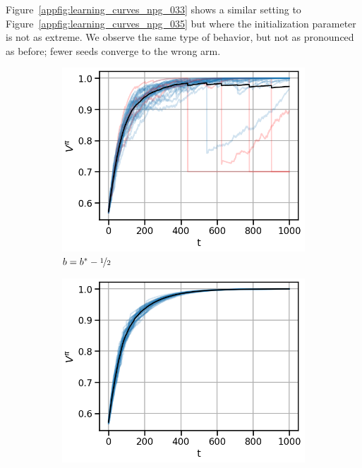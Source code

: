 Figure~\ref{appfig:learning_curves_npg_033} shows a similar setting to Figure~\ref{appfig:learning_curves_npg_035} but where the initialization parameter is not as extreme. We observe the same type of behavior, but not as pronounced as before; fewer seeds converge to the wrong arm.


\begin{figure}[!ht]
\centering
  \begin{subfigure}[b]{0.245\linewidth}
    \includegraphics[width=\textwidth]{articles/baselines/figs/appendix_figs_3arm_000/natural_minvar_-05_eta=0025.png}
    \caption{$b = b^\ast - \nicefrac{1}{2}$}
  \end{subfigure}
    \begin{subfigure}[b]{0.245\linewidth}
    \includegraphics[width=\textwidth]{articles/baselines/figs/appendix_figs_3arm_000/natural_minvar_0_eta=0025.png}

\end{subfigure}
\end{figure}
